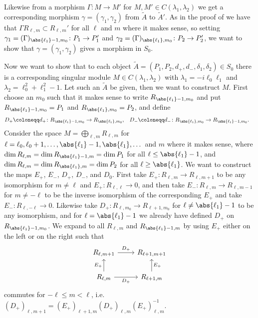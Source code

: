 Likewise from a morphism $\Gamma\colon M\to M'$ for $M,M'\in C(\lambda_1,\lambda_2)$ we get a corresponding morphism $\gamma=(\gamma_1,\gamma_2)$ from $\widetilde{A}$ to $\widetilde{A}'$. As in the proof of  we have that $\Gamma R_{\ell,m} \subset R_{\ell,m}'$ for all $\ell$ and $m$ where it makes sense, so setting $\gamma_1=(\Gamma)_{\abs{\ell_1}-1,m_0}\colon P_1\to P_1'$ and $\gamma_2 = (\Gamma)_{\abs{\ell_1},m_0}\colon P_2\to P_2'$, we want to show that $\gamma=(\gamma_1,\gamma_2)$ gives a morphism in $S_0$. 

Now we want to show that to each object $\widetilde{A}=(P_1,P_2,d_+,d_-,\delta_1,\delta_2)\in S_0$ there is a corresponding singular module $M\in C(\lambda_1,\lambda_2)$ with $\lambda_1=-i\ell_0\ell_1$ and $\lambda_2=\ell_0^2+\ell_1^2-1$. Let such an $\widetilde{A}$ be given, then we want to construct $M$. First choose an $m_0$ such that it makes sense to write $R_{\abs{\ell_1}-1,m_0}$ and put $R_{\abs{\ell_1}-1,m_0}=P_1$ and $R_{\abs{\ell_1},m_0}=P_2$, and define
\begin{align*}
  D_+\coloneqq d_+\colon R_{\abs{\ell_1}-1,m_0}&\to R_{\abs{\ell_1},m_0}, & D_-\coloneqq d_-\colon R_{\abs{\ell_1},m_0} &\to R_{\abs{\ell_1}-1,m_0}.
\end{align*}
Consider the space $M=\bigoplus_{\ell,m}R_{\ell,m}$ for $\ell=\ell_0,\ell_0+1,\dotsc,\abs{\ell_1}-1,\abs{\ell_1},\dotsc$ and $m$ where it makes sense, where $\dim R_{\ell,m}=\dim R_{\abs{\ell_1}-1,m}=\dim P_1$ for all $\ell\leq \abs{\ell_1}-1$, and $\dim R_{\ell,m}=\dim R_{\abs{\ell_1},m}=\dim P_2$ for all $\ell\geq \abs{\ell_1}$. We want to construct the maps $E_+$, $E_-$, $D_+$, $D_-$, and $D_0$. First take $E_+\colon R_{\ell,m}\to R_{\ell,m+1}$ to be any isomorphism for $m\neq \ell$ and $E_+\colon R_{\ell,\ell}\to 0$, and then take $E_-\colon R_{\ell,m}\to R_{\ell,m-1}$ for $m\neq -\ell$ to be the inverse isomorphism of the corresponding $E_+$ and take $E_-\colon R_{\ell,-\ell}\to 0$. Likewise take $D_+\colon R_{\ell,m_0}\to R_{\ell+1,m_0}$ for $\ell\neq \abs{\ell_1}-1$ to be any isomorphism, and for $\ell=\abs{\ell_1}-1$ we already have defined $D_+$ on $R_{\abs{\ell_1}-1,m_0}$. We expand to all $R_{\ell,m}$ and $R_{\abs{\ell_1}-1,m}$ by using $E_+$ either on the left or on the right such that
\[
  \begin{tikzcd}
    R_{\ell,m+1} \ar[r,"D_+"] & R_{\ell+1,m+1} \\
    R_{\ell,m}\ar[u,"E_+"] \ar[r,"D_+",swap] & R_{\ell+1,m}\ar[u,"E_+",swap]
  \end{tikzcd}
\]
commutes for $-\ell\leq m<\ell$, i.e.\ $(D_+)_{\ell,m+1}=(E_+)_{\ell+1,m} (D_+)_{\ell,m} (E_+)_{\ell,m}^{-1}$. 

